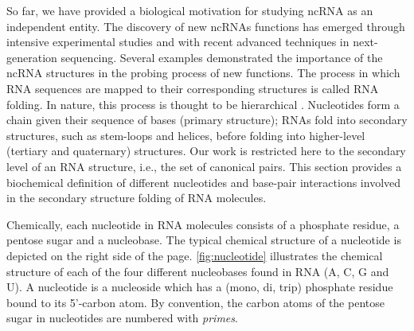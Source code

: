 So far, we have provided a biological motivation for studying \ac{ncRNA} as an independent entity. The discovery of new \acp{ncRNA} functions has emerged through intensive experimental studies and with recent advanced techniques in next-generation sequencing. Several examples demonstrated the importance of the \ac{ncRNA} structures in the probing process of new functions. The process in which \ac{RNA} sequences are mapped to their corresponding structures is called \ac{RNA} folding. In nature, this process is thought to be hierarchical \cite{brion1997hierarchy,tinoco1999rna}. Nucleotides form a chain given their sequence of bases (primary structure); \acp{RNA} fold into secondary structures, such as stem-loops and helices, before folding into higher-level (tertiary and quaternary) structures. Our work is restricted here to the secondary level of an \ac{RNA} structure, i.e., the set of canonical pairs. This section provides a biochemical definition of different nucleotides and base-pair interactions involved in the secondary structure folding of \ac{RNA} molecules. 


Chemically, each nucleotide in \ac{RNA} molecules consists of a phosphate residue, a pentose sugar and a nucleobase. The typical chemical structure of a nucleotide is depicted on the right side of the page. \autoref{fig:nucleotide} illustrates the chemical structure of each of the four different nucleobases found in \ac{RNA} (A, C, G and U). A nucleotide is a nucleoside which has a (mono, di, trip) phosphate residue bound to its 5'-carbon atom. By convention, the carbon atoms of the pentose sugar in nucleotides are numbered with \textit{primes}.

